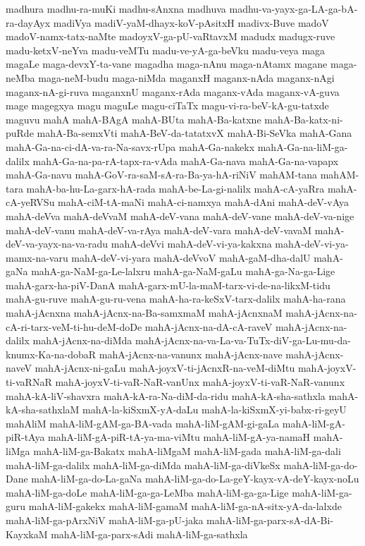 {madhura
madhu-ra-muKi
madhu-sAnxna
madhuva
madhu-va-yayx-ga-LA-ga-bA-ra-dayAyx
madiVya
madiV-yaM-dhayx-koV-pAsitxH
madivx-Buve
madoV
madoV-namx-tatx-naMte
madoyxV-ga-pU-vaRtavxM
madudx
madugx-ruve
madu-ketxV-neYva
madu-veMTu
madu-ve-yA-ga-beVku
madu-veya
maga
magaLe
maga-devxY-ta-vane
magadha
maga-nAnu
maga-nAtamx
magane
maga-neMba
maga-neM-budu
maga-niMda
maganxH
maganx-nAda
maganx-nAgi
maganx-nA-gi-ruva
maganxnU
maganx-rAda
maganx-vAda
maganx-vA-guva
mage
magegxya
magu
maguLe
magu-ciTaTx
magu-vi-ra-beV-kA-gu-tatxde
maguvu
mahA
mahA-BAgA
mahA-BUta
mahA-Ba-katxne
mahA-Ba-katx-ni-puRde
mahA-Ba-semxVti
mahA-BeV-da-tatatxvX
mahA-Bi-SeVka
mahA-Gana
mahA-Ga-na-ci-dA-va-ra-Na-savx-rUpa
mahA-Ga-nakekx
mahA-Ga-na-liM-ga-dalilx
mahA-Ga-na-pa-rA-tapx-ra-vAda
mahA-Ga-nava
mahA-Ga-na-vapapx
mahA-Ga-navu
mahA-GoV-ra-saM-sA-ra-Ba-ya-hA-riNiV
mahAM-tana
mahAM-tara
mahA-ba-hu-La-garx-hA-rada
mahA-be-La-gi-nalilx
mahA-cA-yaRra
mahA-cA-yeRVSu
mahA-ciM-tA-maNi
mahA-ci-namxya
mahA-dAni
mahA-deV-vAya
mahA-deVva
mahA-deVvaM
mahA-deV-vana
mahA-deV-vane
mahA-deV-va-nige
mahA-deV-vanu
mahA-deV-va-rAya
mahA-deV-vara
mahA-deV-vavaM
mahA-deV-va-yayx-na-va-radu
mahA-deVvi
mahA-deV-vi-ya-kakxna
mahA-deV-vi-ya-mamx-na-varu
mahA-deV-vi-yara
mahA-deVvoV
mahA-gaM-dha-dalU
mahA-gaNa
mahA-ga-NaM-ga-Le-lalxru
mahA-ga-NaM-gaLu
mahA-ga-Na-ga-Lige
mahA-garx-ha-piV-DanA
mahA-garx-mU-la-maM-tarx-vi-de-na-likxM-tidu
mahA-gu-ruve
mahA-gu-ru-vena
mahA-ha-ra-keSxV-tarx-dalilx
mahA-ha-rana
mahA-jAcnxna
mahA-jAcnx-na-Ba-samxmaM
mahA-jAcnxnaM
mahA-jAcnx-na-cA-ri-tarx-veM-ti-hu-deM-doDe
mahA-jAcnx-na-dA-cA-raveV
mahA-jAcnx-na-dalilx
mahA-jAcnx-na-diMda
mahA-jAcnx-na-va-La-va-TuTx-diV-ga-Lu-mu-da-knumx-Ka-na-dobaR
mahA-jAcnx-na-vanunx
mahA-jAcnx-nave
mahA-jAcnx-naveV
mahA-jAcnx-ni-gaLu
mahA-joyxV-ti-jAcnxR-na-veM-diMtu
mahA-joyxV-ti-vaRNaR
mahA-joyxV-ti-vaR-NaR-vanUnx
mahA-joyxV-ti-vaR-NaR-vanunx
mahA-kA-liV-shavxra
mahA-kA-ra-Na-diM-da-ridu
mahA-kA-sha-sathxla
mahA-kA-sha-sathxlaM
mahA-la-kiSxmX-yA-daLu
mahA-la-kiSxmX-yi-babx-ri-geyU
mahAliM
mahA-liM-gAM-ga-BA-vada
mahA-liM-gAM-gi-gaLa
mahA-liM-gA-piR-tAya
mahA-liM-gA-piR-tA-ya-ma-viMtu
mahA-liM-gA-ya-namaH
mahA-liMga
mahA-liM-ga-Bakatx
mahA-liMgaM
mahA-liM-gada
mahA-liM-ga-dali
mahA-liM-ga-dalilx
mahA-liM-ga-diMda
mahA-liM-ga-diVkeSx
mahA-liM-ga-do-Dane
mahA-liM-ga-do-La-gaNa
mahA-liM-ga-do-La-geY-kayx-vA-deY-kayx-noLu
mahA-liM-ga-doLe
mahA-liM-ga-ga-LeMba
mahA-liM-ga-ga-Lige
mahA-liM-ga-guru
mahA-liM-gakekx
mahA-liM-gamaM
mahA-liM-ga-nA-sitx-yA-da-lalxde
mahA-liM-ga-pArxNiV
mahA-liM-ga-pU-jaka
mahA-liM-ga-parx-sA-dA-Bi-KayxkaM
mahA-liM-ga-parx-sAdi
mahA-liM-ga-sathxla
}
